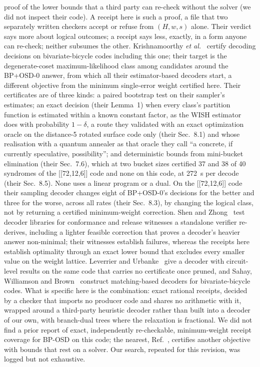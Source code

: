 \documentclass[aps,pra,twocolumn,superscriptaddress,nofootinbib,longbibliography,floatfix]{revtex4-2}
\begin{document}
proof of the lower bounds that a third party can re-check without the solver (we did not inspect their code). A receipt here is such a proof, a file that two separately written checkers accept or refuse from $(H,w,s)$ alone. Their verdict says more about logical outcomes; a receipt says less, exactly, in a form anyone can re-check; neither subsumes the other. Krishnamoorthy \textit{et al.}~\cite{krishnamoorthy2026certified} certify decoding decisions on bivariate-bicycle codes including this one; their target is the degenerate-coset maximum-likelihood class among candidates around the BP+OSD-0 answer, from which all their estimator-based decoders start, a different objective from the minimum single-error weight certified here. Their certificates are of three kinds: a paired bootstrap test on their sampler's estimates; an exact decision (their Lemma~1) when every class's partition function is estimated within a known constant factor, as the WISH estimator does with probability $1-\delta$, a route they validated with an exact optimization oracle on the distance-5 rotated surface code only (their Sec.~8.1) and whose realisation with a quantum annealer as that oracle they call ``a concrete, if currently speculative, possibility''; and deterministic bounds from mini-bucket elimination (their Sec.~7.6), which at two bucket sizes certified 37 and 38 of 40 syndromes of the [[72,12,6]] code and none on this code, at 272~s per decode (their Sec.~8.5). None uses a linear program or a dual. On the [[72,12,6]] code their sampling decoder changes eight of BP+OSD-0's decisions for the better and three for the worse, across all rates (their Sec.~8.3), by changing the logical class, not by returning a certified minimum-weight correction. Shen and Zhong~\cite{shen2026capability} test decoder libraries for conformance and release witnesses a standalone verifier re-derives, including a lighter feasible correction that proves a decoder's heavier answer non-minimal; their witnesses establish failures, whereas the receipts here establish optimality through an exact lower bound that excludes every smaller value on the weight lattice. Leverrier and Urbanke~\cite{leverrier2026approximating} give a decoder with circuit-level results on the same code that carries no certificate once pruned, and Sahay, Williamson and Brown~\cite{sahay2026matching} construct matching-based decoders for bivariate-bicycle codes. What is specific here is the combination: exact rational receipts, decided by a checker that imports no producer code and shares no arithmetic with it, wrapped around a third-party heuristic decoder rather than built into a decoder of our own, with branch-dual trees where the relaxation is fractional. We did not find a prior report of exact, independently re-checkable, minimum-weight receipt coverage for BP-OSD on this code; the nearest, Ref.~\cite{banfi2026certified}, certifies another objective with bounds that rest on a solver. Our search, repeated for this revision, was logged but not exhaustive.
\end{document}
